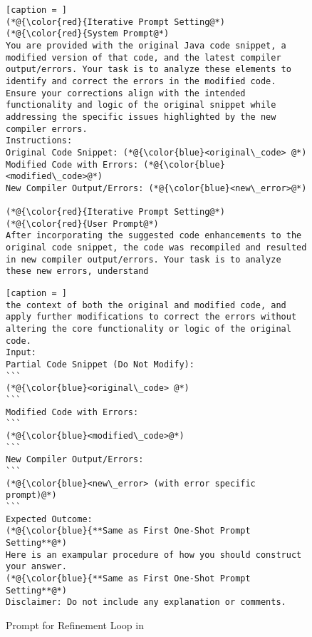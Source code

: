 \begin{figure}[t]
	\centering
\begin{minipage}{.5\textwidth}        
\begin{lstlisting}[caption = ]
(*@{\color{red}{Iterative Prompt Setting@*)
(*@{\color{red}{System Prompt@*)
You are provided with the original Java code snippet, a modified version of that code, and the latest compiler output/errors. Your task is to analyze these elements to identify and correct the errors in the modified code. Ensure your corrections align with the intended functionality and logic of the original snippet while addressing the specific issues highlighted by the new compiler errors.
Instructions:
Original Code Snippet: (*@{\color{blue}<original\_code> @*)
Modified Code with Errors: (*@{\color{blue}<modified\_code>@*)
New Compiler Output/Errors: (*@{\color{blue}<new\_error>@*)

(*@{\color{red}{Iterative Prompt Setting@*)
(*@{\color{red}{User Prompt@*)
After incorporating the suggested code enhancements to the original code snippet, the code was recompiled and resulted in new compiler output/errors. Your task is to analyze these new errors, understand
\end{lstlisting}
\end{minipage}
\begin{minipage}{.5\textwidth}        
\begin{lstlisting}[caption = ]
the context of both the original and modified code, and apply further modifications to correct the errors without altering the core functionality or logic of the original code.    
Input:
Partial Code Snippet (Do Not Modify): 
```
(*@{\color{blue}<original\_code> @*)
```
Modified Code with Errors: 
```
(*@{\color{blue}<modified\_code>@*)
```
New Compiler Output/Errors: 
```
(*@{\color{blue}<new\_error> (with error specific prompt)@*)
```
Expected Outcome:
(*@{\color{blue}{**Same as First One-Shot Prompt Setting**@*)
Here is an exampular procedure of how you should construct your answer.
(*@{\color{blue}{**Same as First One-Shot Prompt Setting**@*)
Disclaimer: Do not include any explanation or comments.
\end{lstlisting}
\end{minipage}

\vspace{-12pt}
\caption{Prompt for Refinement Loop in {\tool}}
\label{fig:refine-prompt}
\end{figure}
